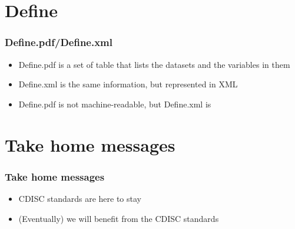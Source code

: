 \documentclass{beamer}
\begin{document}
%	


\section[Define]{Define}

\begin{frame}
	\frametitle{Define.pdf/Define.xml}
	
	\begin{itemize}
		\item Define.pdf is a set of table that lists the datasets and the variables in them
		\item Define.xml is the same information, but represented in XML 
		\item Define.pdf is not machine-readable, but Define.xml is
	\end{itemize}
\end{frame}



\section{Take home messages}

\begin{frame}
  \frametitle{Take home messages}

	\begin{itemize}
      \item CDISC standards are here to stay
      \item (Eventually) we will benefit from the CDISC standards
	\end{itemize}
\end{frame}  

%
%  
%	
\end{document}
